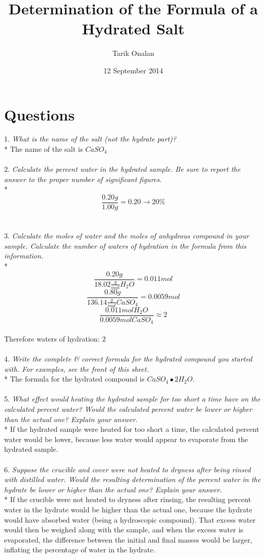 \documentclass[12pt]{article}
\title{Determination of the Formula of a Hydrated Salt}
\date{12 September 2014}
\author{Tarik Onalan}
\begin{document}
    \maketitle
    \section{Questions}
        1. \textit{What is the name of the salt (not the hydrate part)?} \\*
        The name of the salt is \(CaSO_{4}\) \\\\
        2. \textit{Calculate the percent water in the hydrated sample. Be sure to
        report the answer to the proper number of significant figures.} \\*
        \[\frac{0.20g}{1.00g}=0.20\to20\%\] \\\\
        3. \textit{Calculate the moles of water and the moles of anhydrous compound
        in your sample. Calculate the number of waters of hydration in the formula
        from this information.} \\*
        \[\frac{0.20g}{18.02\frac{g}{mol} H_{2}O}=0.011mol\]
        \[\frac{0.80g}{136.14\frac{g}{mol} CaSO_{4}}=0.0059mol\]
        \[\frac{0.011mol H_{2}O}{0.0059mol CaSO_{4}}\approx2\] \\
        Therefore waters of hydration: \(2\) \\\\
        4. \textit{Write the complete \& correct formula for the hydrated compound you
        started with. For examples, see the front of this sheet.} \\*
        The formula for the hydrated compound is \(CaSO_{4}\bullet{2H_{2}O}\). \\\\
        5. \textit{What effect would heating the hydrated sample for too short a time
        have on the calculated percent water? Would the calculated percent water be
        lower or higher than the actual one? Explain your answer.} \\*
        If the hydrated sample were heated for too short a time, the calculated percent
        water would be lower, because less water would appear to evaporate from the
        hydrated sample. \\\\
        6. \textit{Suppose the crucible and cover were not heated to dryness after
        being rinsed with distilled water. Would the resulting determination of the
        percent water in the hydrate be lower or higher than the actual one? Explain
        your answer.} \\*
        If the crucible were not heated to dryness after rinsing, the resulting percent
        water in the hydrate would be higher than the actual one, because the hydrate
        would have absorbed water (being a hydroscopic compound). That excess water
        would then be weighed along with the sample, and when the excess water is
        evaporated, the difference between the initial and final masses would be
        larger, inflating the percentage of water in the hydrate. \\\\
\end{document}
